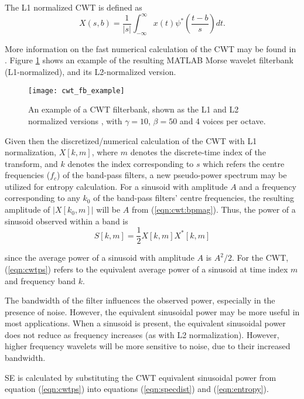 The L1 normalized CWT is defined as
\begin{equation}
	X(s,b) = \frac{1}{|s|} \int_{-\infty}^{\infty} x(t) \psi^*\left(\frac{t-b}{s}\right) dt.
\end{equation}




More information on the fast numerical calculation of the CWT may be found in \citep{fcwt}. Figure \ref{fig:cwt_fb_example} shows an example of the resulting MATLAB Morse wavelet filterbank (L1-normalized), and its L2-normalized version.

\begin{figure}[t]
	\centering
	\texttt{[image: cwt\_fb\_example]}
	\caption[An example of a CWT filterbank.]{An example of a CWT filterbank, shown as the L1 and L2 normalized versions , with $\gamma = 10$, $\beta=50$ and 4 voices per octave.}
	\label{fig:cwt_fb_example}
\end{figure}

Given then the discretized/numerical calculation of the CWT with L1 normalization, $X[k,m]$, where $m$ denotes the discrete-time index of the transform, and $k$ denotes the index corresponding to $s$ which refers the centre frequencies ($f_c$) of the band-pass filters, a new pseudo-power spectrum may be utilized for entropy calculation. For a sinusoid with amplitude $A$ and a frequency corresponding to any $k_0$ of the band-pass filters' centre frequencies, the resulting amplitude of $|X[k_0,m]|$ will be $A$ from (\ref{eqn:cwt:bpmag}). Thus, the power of a sinusoid observed within a band is
\begin{equation}
	\label{eqn:cwtps}
	S[k,m] = \frac{1}{2} X[k,m] X^*[k,m]
\end{equation}

\noindent since the average power of a sinusoid with amplitude $A$ is $A^2/2$. For the CWT, (\ref{eqn:cwtps}) refers to the equivalent average power of a sinusoid at time index $m$ and frequency band $k$.

The bandwidth of the filter influences the observed power, especially in the presence of noise. However, the equivalent sinusoidal power may be more useful in most applications. When a sinusoid is present, the equivalent sinusoidal power does not reduce as frequency increases (as with L2 normalization). However, higher frequency wavelets will be more sensitive to noise, due to their increased bandwidth.

SE is calculated by substituting the CWT equivalent sinusoidal power from equation (\ref{eqn:cwtps}) into equations (\ref{eqn:specdist}) and (\ref{eqn:entropy}).

